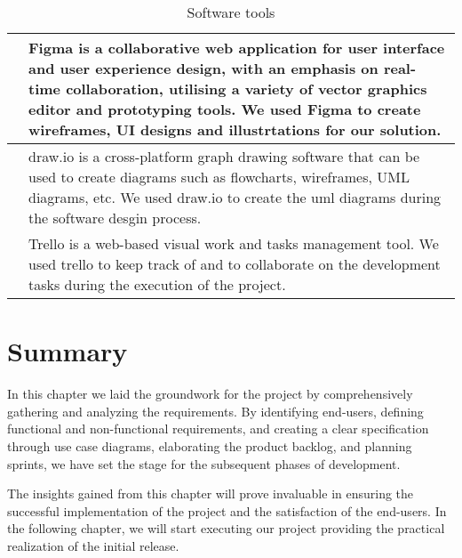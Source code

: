 \begin{table}[hbt!]
\begin{tabular}{ | m{} | m{} | }
            \hline
            \centering     & Figma is a collaborative web application for user interface and user experience design, with an emphasis on real-time collaboration, utilising a variety of vector graphics editor and prototyping tools. We used Figma to create wireframes, UI designs and illustrtations for our solution.                                  \\
            \hline
            \centering    & draw.io is a cross-platform graph drawing software that can be used to create diagrams such as flowcharts, wireframes, UML diagrams, etc. We used draw.io to create the uml diagrams during the software desgin process.                                                                                                       \\
            \hline
            \centering    & Trello is a web-based visual work and tasks management tool. We used trello to keep track of and to collaborate on the development tasks during the execution of the project.                                                                                                                                                  \\
            \hline
      \end{tabular}
      \caption{Software tools}
      \label{tools}
\end{table}

\pagebreak
{}
\section*{Summary}
In this chapter we laid the groundwork for the project by comprehensively gathering and analyzing
the requirements. By identifying end-users, defining functional and non-functional requirements,
and creating a clear specification through use case diagrams, elaborating the product backlog,
and planning sprints, we have set the stage for the subsequent phases of development.

The insights gained from this chapter will prove invaluable in ensuring the successful implementation
of the project and the satisfaction of the end-users. In the following chapter, we will start executing
our project providing the practical realization of the initial release.
